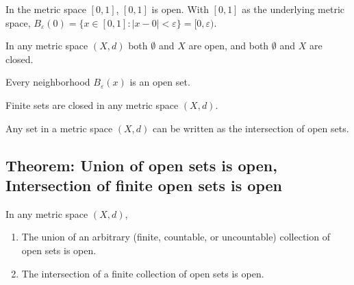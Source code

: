 \documentclass[11pt]{elegantbook}
\begin{document}
\begin{example}
    In the metric space $[0, 1]$, $[0, 1]$ is open. With $[0, 1]$ as the underlying metric space, $B_\varepsilon(0) = \{x \in [0, 1] : |x - 0| < \varepsilon\} = [0,\varepsilon)$.
\end{example}

\begin{theorem}
    In any metric space $(X, d)$ both $\emptyset$ and $X$ are open, and both $\emptyset$ and $X$ are closed.
\end{theorem}

\begin{theorem}
    Every neighborhood $B_\varepsilon(x)$ is an open set.
\end{theorem}

\begin{theorem}
    Finite sets are closed in any metric space $(X, d)$.
\end{theorem}

\begin{proposition}
    Any set in a metric space $(X, d)$ can be written as the intersection of open sets.
\end{proposition}

\subsection{Theorem: Union of open sets is open, Intersection of finite open sets is open}
\begin{theorem}
    In any metric space $(X, d)$,
    \begin{enumerate}
        \item The union of an arbitrary (finite, countable, or uncountable) collection of open sets is open.
        \item The intersection of a finite collection of open sets is open.
    \end{enumerate}
\end{theorem}
\end{document}

